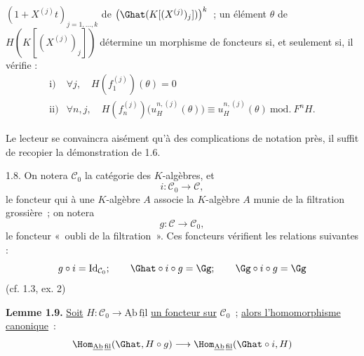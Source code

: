 
\((1+X^{(j)}t)_{j=1,\ldots,k}\) de \(\bigl(\Ghat(K[(X^{(j)})_j])\bigr)^k\)~; un
élément \(\theta\) de \(H(K[(X^{(j)})_j])\) détermine un morphisme de foncteurs si, et seulement si, il vérifie :
\[
\begin{array}{ll}
\text{i)}& \forall j,\quad H(f_1^{(j)})(\theta)=0\\[0.3em]
\text{ii)}& \forall n,j,\quad
H(f_n^{(j)})\bigl(u_H^{n,(j)}(\theta)\bigr)
\equiv u_H^{n,(j)}(\theta)\ \mathrm{mod.}\ F^nH.
\end{array}
\]

Le lecteur se convaincra aisément qu'à des complications de notation près, il suffit de recopier la démonstration de 1.6.

1.8. On notera \(\mathcal C_0\) la catégorie des \(K\)-algèbres, et
\[
  i:\mathcal C_0\longrightarrow \mathcal C,
\]
le foncteur qui à une \(K\)-algèbre \(A\) associe la \(K\)-algèbre \(A\) munie de la filtration grossière~; on notera
\[
  g:\mathcal C\longrightarrow\mathcal C_0,
\]
le foncteur «~oubli de la filtration~». Ces foncteurs vérifient les relations suivantes :
\[
  g\circ i=\operatorname{Id}_{\mathcal C_0};\qquad
  \Ghat\circ i\circ g=\Gg;\qquad
  \Gg\circ i\circ g=\Gg
\]
(cf. 1.3, ex. 2)

\textbf{Lemme 1.9.} \uline{Soit} \(H:\mathcal C_0\to\underline{\mathrm{Ab}}\,\underline{\mathrm{fil}}\) \uline{un foncteur sur} \(\mathcal C_0\)~; \uline{alors l'homomorphisme canonique}~:
\[
  \Hom_{\underline{\mathrm{Ab}}\,\underline{\mathrm{fil}}}(\Ghat,H\circ g)
  \longrightarrow
  \Hom_{\underline{\mathrm{Ab}}\,\underline{\mathrm{fil}}}(\Ghat\circ i,H)
\]
